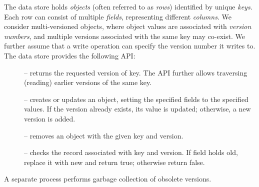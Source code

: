 The  data store holds  \emph{objects} (often referred to as \emph{rows}) identified by unique \emph{keys}.
Each row can consist of multiple \emph{fields}, representing different \emph{columns}. 
We consider multi-versioned objects, where object values are associated with \emph{version numbers}, and
multiple versions associated with the same key may co-exist.
We further assume that a write operation can specify the version number it writes to.
The  data store provides the following API:
\begin{description}
\item [] --  returns the requested version of key.
The API further allows traversing (reading) earlier versions of the same key.
\item [] -- 
creates or updates an object, setting the specified fields to the specified values. 
If the version already exists, its value is updated; otherwise, a new version is added. 
\item [] -- removes an object with the given key and version.
\item [] -- checks the record associated with key and version. 
If field holds old, replace it with new   and return true; otherwise return false.
\end{description}

A separate process performs garbage collection of obsolete versions.

